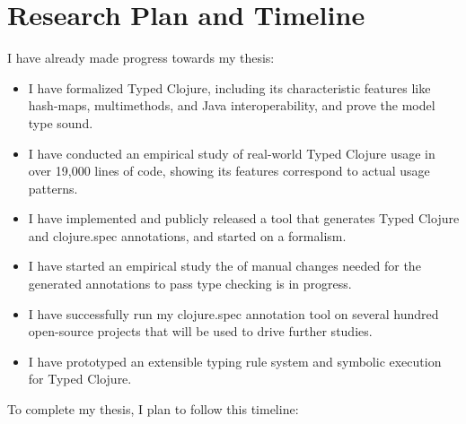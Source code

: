 \documentclass[9pt]{extarticle}
\begin{document}
\section{Research Plan and Timeline}

I have already made progress towards my thesis:

\begin{itemize}
  \item I have formalized Typed Clojure, including
    its characteristic features like hash-maps, multimethods, and Java interoperability,
    and prove the model type sound.
  \item I have conducted an empirical study of real-world Typed Clojure usage
    in over 19,000 lines of code, showing its features correspond to actual usage patterns.
  \item I have implemented and publicly released a tool that generates
    Typed Clojure and clojure.spec annotations, and started on a formalism.
  \item I have started an empirical study the of manual changes needed for the generated annotations
    to pass type checking is in progress.
  \item I have successfully run my clojure.spec annotation tool on several hundred open-source projects that
    will be used to drive further studies.
  \item I have prototyped an extensible typing rule system and symbolic execution for Typed Clojure.
\end{itemize}

To complete my thesis, I plan to follow this timeline:
\end{document}
